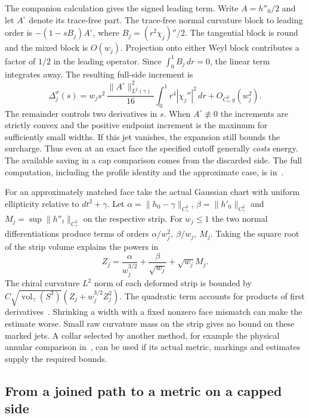 \documentclass[11pt,letterpaper]{article}
\numberwithin{equation}{section}
\begin{document}
The companion calculation gives the signed leading term. Write
\(A=h''_0/2\) and let \(A^\circ\) denote its trace-free part. The
trace-free normal curvature block to leading order is
\(-(1-sB_j)A^\circ\), where \(B_j=(r^2\chi_j)''/2\). The tangential
block is round and the mixed block is \(O(w_j)\). Projection onto
either Weyl block contributes a factor of \(1/2\) in the leading
operator. Since \(\int_0^1 B_j\,dr=0\), the linear term integrates away.
The resulting full-side increment is
\begin{equation}\label{eq:jet}
 \Delta_j^\sigma(s)
 = w_j s^2\,\frac{\|A^\circ\|_{L^2(\gamma)}^2}{16}
       \int_0^1 r^4|\chi_j''|^2\,dr + O_{C^2_s,g}(w_j^2).
\end{equation}
The remainder controls two derivatives in \(s\). When
\(A^\circ\not\equiv0\) the increments are strictly convex and the
positive endpoint increment is the maximum for sufficiently small
widths. If this jet vanishes, the expansion still bounds the
surcharge. Thus even at an exact face the specified cutoff generally
\emph{costs} energy. The available saving in a cap comparison comes
from the discarded side. The full computation, including the profile
identity and the approximate case, is in~\cite{Baker2026CollarDeformation}.

For an approximately matched face take the actual Gaussian chart with
uniform ellipticity relative to \(dt^2+\gamma\). Let
\(\alpha=\|h_0-\gamma\|_{C^2_\gamma}\),
\(\beta=\|h'_0\|_{C^2_\gamma}\) and
\(M_j=\sup\|h''_t\|_{C^2_\gamma}\) on the respective strip.
For \(w_j\le1\) the two normal differentiations produce terms of orders
\(\alpha/w_j^2,\ \beta/w_j,\ M_j\). Taking the square root of the strip
volume explains the powers in
\[
 Z_j=\frac{\alpha}{w_j^{3/2}}+\frac{\beta}{\sqrt{w_j}}+\sqrt{w_j}M_j .
\]
The chiral curvature \(L^2\) norm of each deformed strip is bounded by
\(C\sqrt{\operatorname{vol}_\gamma(S^3)}
 (Z_j+w_j^{3/2}Z_j^2)\). The quadratic term accounts for products of
first derivatives~\cite{Baker2026CollarDeformation}. Shrinking a width
with a fixed nonzero face mismatch can make the estimate worse.
Small raw curvature mass on the strip gives no bound on these marked
jets. A collar selected by another method, for example the physical
annular comparison in~\cite{Baker2026MarkedLimits,Baker2026CollarDeformation},
can be used if its actual metric, markings and estimates supply the
required bounds.

\subsection{From a joined path to a metric on a capped side}
\end{document}
